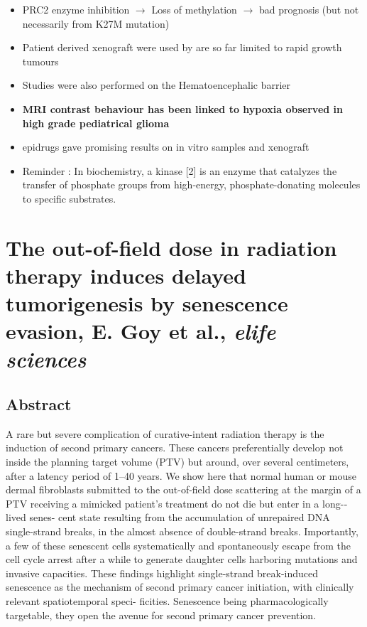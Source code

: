 \documentclass[11pt,a4paper]{article}
\begin{document}
\begin{itemize}
\item PRC2 enzyme inhibition $\rightarrow$ Loss of methylation $\rightarrow$ bad prognosis (but not necessarily from K27M mutation)
\item Patient derived xenograft were used by are so far limited to rapid growth tumours
\item Studies were also performed on the Hematoencephalic barrier
\item \textbf{MRI contrast behaviour has been linked to hypoxia observed in high grade pediatrical glioma}
\item epidrugs gave promising results on in vitro samples and xenograft
\item Reminder : In biochemistry, a kinase [2] is an enzyme that catalyzes the transfer of phosphate groups from high-energy, phosphate-donating molecules to specific substrates.
\end{itemize}

\section*{The out-­of-­field dose in radiation therapy induces delayed tumorigenesis by senescence evasion, E. Goy et al., \textit{elife sciences}}
\subsection*{Abstract}
A rare but severe complication of curative-­intent radiation therapy is the induction of
second primary cancers. These cancers preferentially develop not inside the planning target volume
(PTV) but around, over several centimeters, after a latency period of 1–40 years. We show here that
normal human or mouse dermal fibroblasts submitted to the out-­of-­field dose scattering at the
margin of a PTV receiving a mimicked patient’s treatment do not die but enter in a long-­lived senes-
cent state resulting from the accumulation of unrepaired DNA single-­strand breaks, in the almost
absence of double-­strand breaks. Importantly, a few of these senescent cells systematically and
spontaneously escape from the cell cycle arrest after a while to generate daughter cells harboring
mutations and invasive capacities. These findings highlight single-­strand break-­induced senescence
as the mechanism of second primary cancer initiation, with clinically relevant spatiotemporal speci-
ficities. Senescence being pharmacologically targetable, they open the avenue for second primary
cancer prevention.
\end{document}
